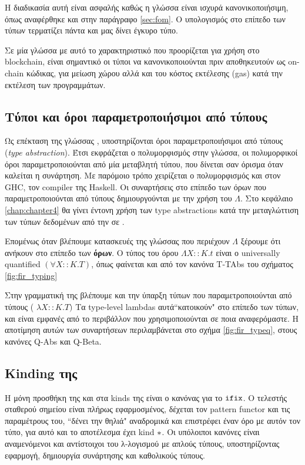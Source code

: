 Η διαδικασία αυτή είναι ασφαλής καθώς η γλώσσα \FOMF{} είναι ισχυρά κανονικοποιήσιμη, όπως αναφέρθηκε
και στην παράγραφο \ref{sec:fom}. Ο υπολογισμός στο επίπεδο των τύπων τερματίζει πάντα και μας δίνει
έγκυρο τύπο.

Σε μία γλώσσα με αυτό το χαρακτηριστικό που προορίζεται για χρήση στο blockchain, είναι σημαντικό
οι τύποι να κανονικοποιούνται πριν αποθηκευτούν ως on-chain κώδικας, για μείωση χώρου αλλά
και του κόστος εκτέλεσης (gas) κατά την εκτέλεση των προγραμμάτων.


\subsection{Τύποι και όροι παραμετροποιήσιμοι από τύπους}

Ως επέκταση της γλώσσας \FOM, υποστηρίζονται όροι παραμετροποιήσιμοι από τύπους
(\emph{type abstraction}).
Έτσι εκφράζεται ο πολυμορφισμός στην γλώσσα, οι πολυμορφικοί όροι παραμετροποιούνται
από μία μεταβλητή τύπου, που δίνεται σαν όρισμα όταν καλείται η συνάρτηση. Με παρόμοιο
τρόπο χειρίζεται ο πολυμορφισμός και στον GHC, τον compiler της Haskell. Οι συναρτήσεις
στο επίπεδο των όρων που παραμετροποιούνται από τύπους δημιουργούνται με την χρήση
του $\Lambda$. Στο κεφάλαιο \ref{chap:chapter4} θα γίνει έντονη χρήση των type abstractions
κατά την μεταγλώττιση των τύπων δεδομένων από την \FIR{} σε \FOMF{}.


Επομένως όταν
βλέπουμε κατασκευές της γλώσσας που περιέχουν $\Lambda$ ξέρουμε ότι ανήκουν
στο επίπεδο των \textbf{όρων}. Ο τύπος του όρου $ \Lambda X :: K . t $ είναι ο universally
quantified $(\forall X::K.T)$, όπως φαίνεται και από τον κανόνα T-TAbs του σχήματος \ref{fig:fir_typing}

Στην γραμματική της \FOMF{} βλέπουμε και την ύπαρξη τύπων που παραμετροποιούνται από
τύπους ( $\lambda X :: K. T)$ Τα type-level lambdas αυτά``κατοικούν" στο επίπεδο των τύπων,
και είναι εμφανές από το περιβάλλον που χρησιμοποιούνται σε ποια αναφερόμαστε. Η αποτίμηση
αυτών των συναρτήσεων περιλαμβάνεται στο σχήμα \ref{fig:fir_typeq}, στους κανόνες Q-Abs και
Q-Beta.



\subsection{Kinding της \FOMF{}}

Η μόνη προσθήκη της \FOMF{} και \FIR{} στα kinds της \FOM{} είναι ο κανόνας
για το $\operatorname{\texttt{ifix}}$. Ο τελεστής σταθερού σημείου είναι πλήρως εφαρμοσμένος, δέχεται
τον pattern functor και τις παραμέτρους  του, ``δένει την θηλιά" αναδρομικά και επιστρέφει
έναν όρο με αυτόν τον τύπο, για αυτό και το αποτέλεσμα έχει kind $\operatorname{\ast}$. Οι υπόλοιποι
κανόνες είναι αναμενόμενοι και αντίστοιχοι του λ-λογισμού με απλούς τύπους, υποστηρίζοντας
εφαρμογή, δημιουργία συνάρτησης και καθολικούς τύπους.

\vspace{1cm}
